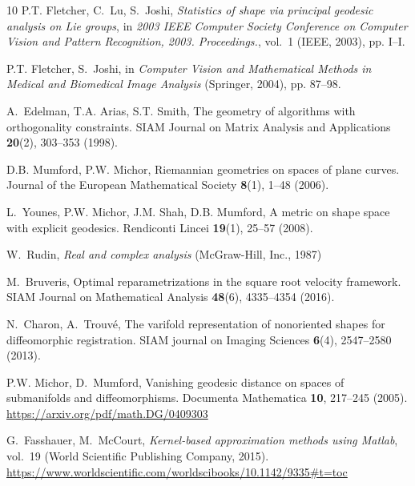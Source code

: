 \documentclass[pdflatex,iicol]{sn-jnl}%
\theoremstyle{thmstyleone}%
\theoremstyle{thmstyletwo}%
\theoremstyle{thmstylethree}%
\begin{document}
\begin{thebibliography}{10}
P.T. Fletcher, C.~Lu, S.~Joshi, \emph{Statistics of shape via principal geodesic analysis on {L}ie groups}, in \emph{2003 IEEE Computer Society Conference on Computer Vision and Pattern Recognition, 2003. Proceedings.}, vol.~1 (IEEE, 2003), pp. I--I.
\newblock {}

P.T. Fletcher, S.~Joshi, in \emph{{Computer Vision and Mathematical Methods in Medical and Biomedical Image Analysis}} (Springer, 2004), pp. 87--98.
\newblock {}

A.~Edelman, T.A. Arias, S.T. Smith, The geometry of algorithms with orthogonality constraints.
\newblock SIAM Journal on Matrix Analysis and Applications \textbf{20}(2), 303--353 (1998).
\newblock {}

D.B. Mumford, P.W. Michor, Riemannian geometries on spaces of plane curves.
\newblock Journal of the European Mathematical Society \textbf{8}(1), 1--48 (2006).
\newblock {}

L.~Younes, P.W. Michor, J.M. Shah, D.B. Mumford, A metric on shape space with explicit geodesics.
\newblock Rendiconti Lincei \textbf{19}(1), 25--57 (2008).
\newblock {}

W.~Rudin, \emph{Real and complex analysis} (McGraw-Hill, Inc., 1987)

M.~Bruveris, Optimal reparametrizations in the square root velocity framework.
\newblock SIAM Journal on Mathematical Analysis \textbf{48}(6), 4335--4354 (2016).
\newblock {}

N.~Charon, A.~Trouv{\'e}, The varifold representation of nonoriented shapes for diffeomorphic registration.
\newblock SIAM journal on Imaging Sciences \textbf{6}(4), 2547--2580 (2013).
\newblock {}

P.W. Michor, D.~Mumford, Vanishing geodesic distance on spaces of submanifolds and diffeomorphisms.
\newblock Documenta Mathematica \textbf{10}, 217--245 (2005).
\newblock \urlprefix\url{https://arxiv.org/pdf/math.DG/0409303}

G.~Fasshauer, M.~McCourt, \emph{Kernel-based approximation methods using {M}atlab}, vol.~19 (World Scientific Publishing Company, 2015).
\newblock \urlprefix\url{https://www.worldscientific.com/worldscibooks/10.1142/9335#t=toc}


\end{thebibliography}
\end{document}

